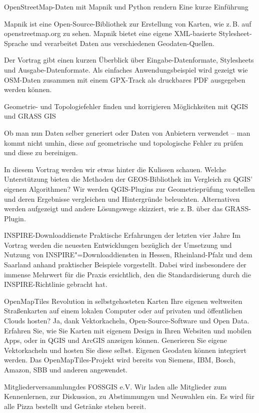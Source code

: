 %
{OpenStreetMap-Daten mit Mapnik und Python rendern\vspace{0.2em}}%
{Eine kurze Einführung}%
{%
Mapnik ist eine Open-Source-Bibliothek zur Erstellung von Karten, wie z.\,B. auf openstreetmap.org
zu sehen. Mapnik bietet eine eigene XML-basierte Stylesheet-Sprache und verarbeitet Daten aus
verschiedenen Geodaten-Quellen.

Der Vortrag gibt einen kurzen Überblick über Eingabe-Datenformate, Stylesheets und
Ausgabe-Datenformate. Als einfaches Anwendungsbeispiel wird gezeigt wie OSM-Daten zusammen
mit einem GPX-Track als druckbares PDF ausgegeben werden können.
}

%
{Geometrie- und Topologiefehler finden und korrigieren}%
{Möglichkeiten mit QGIS und GRASS GIS}%
{%
Ob man nun Daten selber generiert oder Daten von Anbietern verwendet -- man kommt nicht umhin, diese
auf geometrische und topologische Fehler zu prüfen und diese zu bereinigen.

In diesem Vortrag werden wir etwas hinter die Kulissen schauen. Welche Unterstützung bieten die
Methoden der GEOS-Bibliothek im Vergleich zu QGIS' eigenen Algorithmen? Wir werden QGIS-Plugins zur
Geometrieprüfung vorstellen und deren Ergebnisse vergleichen und Hintergründe beleuchten.
Alternativen werden aufgezeigt und andere Lösungswege skizziert, wie z.\,B. über das GRASS-Plugin.%
}

%
{INSPIRE-Downloaddienste}%
{Praktische Erfahrungen der letzten vier Jahre}%
{%
Im Vortrag werden die neuesten Entwicklungen bezüglich der Umsetzung und Nutzung von
INSPIRE"=Downloaddiensten in Hessen, Rheinland-Pfalz und dem Saarland anhand praktischer
Beispiele vorgestellt. Dabei wird insbesondere der immense Mehrwert für die Praxis ersichtlich, den
die Standardisierung durch die INSPIRE-Richtlinie gebracht hat.%
}

%
{OpenMapTiles}%
{Revolution in selbstgehosteten Karten}%
{%
Ihre eigenen weltweiten Straßenkarten auf einem lokalen Computer oder auf privaten und öffentlichen
Clouds hosten? Ja, dank Vektorkacheln, Open-Source-Software und Open Data. Erfahren Sie, wie Sie
Karten mit eigenem Design in Ihren Websiten und mobilen Apps, oder in QGIS und ArcGIS anzeigen
können. Generieren Sie eigene Vektorkacheln und hosten Sie diese selbst. Eigenen Geodaten können
integriert werden. Das OpenMapTiles-Projekt wird bereits von Siemens, IBM, Bosch, Amazon, SBB und
anderen angewendet.%
}

\abstractZwei{}%
{Mitgliederversammlung\linebreak des FOSSGIS e.V.}%
{}%
{%
Wir laden alle Mitglieder zum
Kennenlernen, zur Diskussion, zu Abstimmungen und Neuwahlen ein. Es wird für alle Pizza bestellt und Getränke
stehen bereit.%
}
